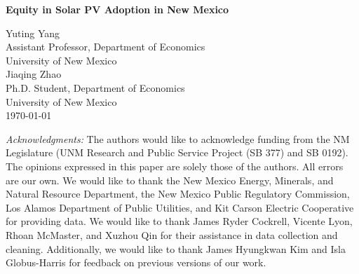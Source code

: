 \begin{titlepage}

\newcommand{\HRule}{\rule{\linewidth}{0.5mm}} 

\begin{center} %



{ \huge \bfseries Equity in Solar PV Adoption in New Mexico}\\ %
\end{center}
\vspace{1.5em}

\begin{center}
    \Large
Yuting Yang\\ %
Assistant Professor, Department of Economics\\
University of New Mexico\\
\vspace{1em}
Jiaqing Zhao\\ %
Ph.D. Student, Department of Economics\\
University of New Mexico\\
\vspace{1.5em}
\today


\vspace{1.5em}
\begin{flushleft}
\normalsize

    \textit{Acknowledgments:} The authors would like to acknowledge funding from the NM Legislature (UNM Research and Public Service Project (SB 377) and SB 0192). The opinions expressed in this paper are solely those of the authors. All errors are our own. We would like to thank the New Mexico Energy, Minerals, and Natural Resource Department, the New Mexico Public Regulatory Commission, Los Alamos Department of Public Utilities, and Kit Carson Electric Cooperative for providing data. We would like to thank James Ryder Cockrell, Vicente Lyon, Rhoan McMaster, and Xuzhou Qin for their assistance in data collection and cleaning. Additionally, we would like to thank 
    James Hyungkwan Kim and Isla Globus-Harris for feedback on previous versions of our work.  \\


\end{flushleft}
\end{center}
\end{titlepage}

